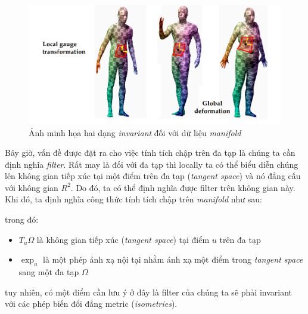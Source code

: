 \begin{figure}[H]
    \centering
    \includegraphics[width=1\linewidth]{Images/GDL/manifold_mesh/local_global_inv.png}
    \caption{Ảnh minh họa hai dạng \textit{invariant} đối với dữ liệu \textit{manifold}\cite{geometricdeep2022}}
    \label{fig:local_global_inv}
\end{figure}

Bây giờ, vấn đề được đặt ra cho việc tính tích chập trên đa tạp là chúng ta cần định nghĩa \textit{filter}. Rất may là đối với đa tạp thì locally ta có thể biểu diễn chúng lên không gian tiếp xúc tại một điểm trên đa tạp (\textit{tangent space}) và nó đẳng cấu với không gian $R^2$. Do đó, ta có thể định nghĩa được filter trên không gian này. Khi đó, ta định nghĩa công thức tính tích chập trên \textit{manifold} như sau:

\begin{center}
\end{center}
trong đó:
\begin{itemize}
    \item $T_u \Omega$ là không gian tiếp xúc (\textit{tangent space}) tại điểm $u$ trên đa tạp

    \item $\exp_u$ là một phép ánh xạ nội tại nhằm ánh xạ một điểm trong \textit{tangent space} sang một đa tạp $\Omega$
\end{itemize}
tuy nhiên, có một điểm cần lưu ý ở đây là filter của chúng ta sẽ phải invariant với các phép biến đổi đẳng metric (\textit{isometries}).

